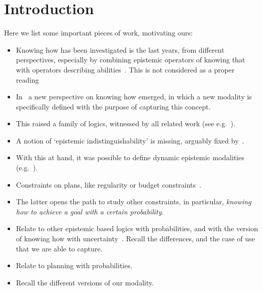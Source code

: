\section{Introduction}
\label{sec:intro}

Here we list some important pieces of work, motivating ours:

\begin{itemize}
    \item Knowing how has been investigated is the last years, from different perspectives, especially by combining epistemic operators of knowing that with operators describing abilities~\cite{Mccarthy69,Moore85,Les00,Hoek00,HerzigT06}. This is not considered as a proper reading~\cite{JamrogaA07,Herzig15}
    \item In~\cite{Wang15lori,Wang16,Wang2016} a new perspective on knowing how emerged, in which a new modality is specifically defined with the purpose of capturing this concept.
    \item This raised a family of logics, witnessed by all related work (see e.g.~\cite{LiWang17,Li17,Li17bis,FervariHLW17,LiW21,NaumovT17,NaumovT18,NaumovT19,Naumov2018a}).
    \item A notion of `epistemic indistinguishability' is missing, arguably fixed by~\cite{AFSVQ21,AFSVQ23}.
    \item With this at hand, it was possible to define dynamic epistemic modalities (e.g.~\cite{AFSV22}).
    \item Constraints on plans, like regularity or budget constraints~\cite{DemriF23}.
    \item The latter opens the path to study other constraints, in particular, \emph{knowing how to achieve a goal with a certain probability}.
    \item Relate to other epistemic based logics with probabilities, and with the version of knowing how with uncertainty~\cite{NaumovT19}. Recall the differences, and the case of use that we are able to capture.
    \item Relate to planning with probabilities.
    \item Recall the different versions of our modality.
\end{itemize}